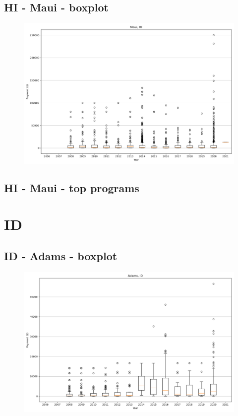 \subsection*{HI - Maui - boxplot}
\begin{figure}[h]
\centering
\includegraphics[width=7in]{../output/boxplots/counties/Maui-HI_boxplot.png}
\end{figure}


\subsection*{HI - Maui - top programs}

\newpage
\section*{ID}
\subsection*{ID - Adams - boxplot}
\begin{figure}[h]
\centering
\includegraphics[width=7in]{../output/boxplots/counties/Adams-ID_boxplot.png}
\end{figure}


